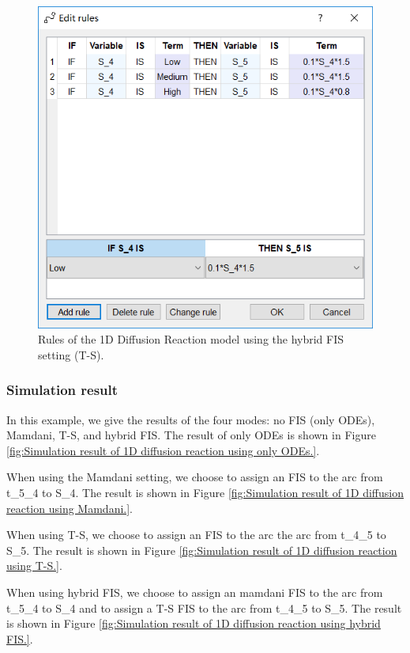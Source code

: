 \documentclass[journal,a4paper,onecolumn]{article}
\begin{document}
\begin{figure}[!hbt]
	\begin{center}
		\includegraphics[width=\columnwidth]{fig40}
		\caption{Rules of the 1D Diffusion Reaction model using the hybrid FIS setting (T-S).}
		\label{fig:Rules of 1D Diffusion Reaction using hybrid FIS (T-S).}
	\end{center}
\end{figure}



\clearpage
\subsubsection{Simulation result}
In this example, we give the results of the four modes: no FIS (only ODEs), Mamdani, T-S, and hybrid FIS. The result of only ODEs is shown in Figure \ref{fig:Simulation result of 1D diffusion reaction using only ODEs.}.

When using the Mamdani setting, we choose to assign an FIS to the arc from t\_5\_4 to S\_4. The result is shown in Figure \ref{fig:Simulation result of 1D diffusion reaction using Mamdani.}.

When using T-S, we choose to assign an FIS to the arc the arc from t\_4\_5 to S\_5. The result is shown in Figure \ref{fig:Simulation result of 1D diffusion reaction using T-S.}.

When using hybrid FIS, we choose to assign an mamdani FIS to the arc from t\_5\_4 to S\_4 and to assign a T-S FIS to the arc from t\_4\_5 to S\_5. 
The result is shown in Figure \ref{fig:Simulation result of 1D diffusion reaction using hybrid FIS.}.
\end{document}
